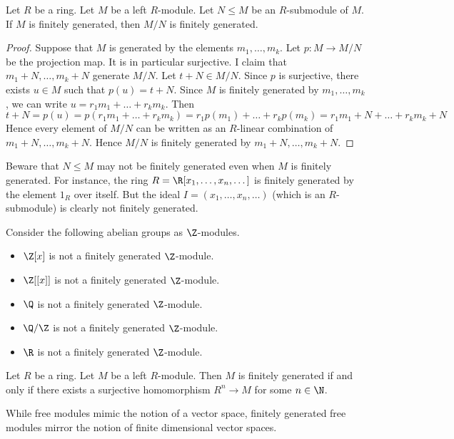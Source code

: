 \documentclass[a4paper]{article}
\begin{document}
\begin{prp}{}{} Let $R$ be a ring. Let $M$ be a left $R$-module. Let $N\leq M$ be an $R$-submodule of $M$. If $M$ is finitely generated, then $M/N$ is finitely generated. \tcbline
\begin{proof}
Suppose that $M$ is generated by the elements $m_1,\dots,m_k$. Let $p:M\to M/N$ be the projection map. It is in particular surjective. I claim that $m_1+N,\dots,m_k+N$ generate $M/N$. Let $t+N\in M/N$. Since $p$ is surjective, there exists $u\in M$ such that $p(u)=t+N$. Since $M$ is finitely generated by $m_1,\dots,m_k$, we can write $u=r_1m_1+\dots+r_km_k$. Then $$t+N=p(u)=p(r_1m_1+\dots+r_km_k)=r_1p(m_1)+\dots+r_kp(m_k)=r_1m_1+N+\dots+r_km_k+N$$ Hence every element of $M/N$ can be written as an $R$-linear combination of $m_1+N,\dots,m_k+N$. Hence $M/N$ is finitely generated by $m_1+N,\dots,m_k+N$. 
\end{proof}
\end{prp}

Beware that $N\leq M$ may not be finitely generated even when $M$ is finitely generated. For instance, the ring $R=\R[x_1,\dots,x_n,\dots]$ is finitely generated by the element $1_R$ over itself. But the ideal $I=(x_1,\dots,x_n,\dots)$ (which is an $R$-submodule) is clearly not finitely generated. 

\begin{eg}{}{} Consider the following abelian groups as $\Z$-modules. 
\begin{itemize}
\item $\Z[x]$ is not a finitely generated $\Z$-module. 
\item $\Z[[x]]$ is not a finitely generated $\Z$-module. 
\item $\Q$ is not a finitely generated $\Z$-module. 
\item $\Q/\Z$ is not a finitely generated $\Z$-module. 
\item $\R$ is not a finitely generated $\Z$-module. 
\end{itemize}
\end{eg}

\begin{prp}{}{} Let $R$ be a ring. Let $M$ be a left $R$-module. Then $M$ is finitely generated if and only if there exists a surjective homomorphism $R^n\to M$ for some $n\in\N$. 
\end{prp}

While free modules mimic the notion of a vector space, finitely generated free modules mirror the notion of finite dimensional vector spaces. 
\end{document}
